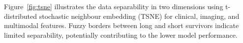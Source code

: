 
Figure~\ref{fig:tsne} illustrates the data separability in two dimensions using t-distributed stochastic neighbour embedding (TSNE) for clinical, imaging, and multimodal features.
Fuzzy borders between long and short survivors indicate limited separability, potentially contributing to the lower model performance.

